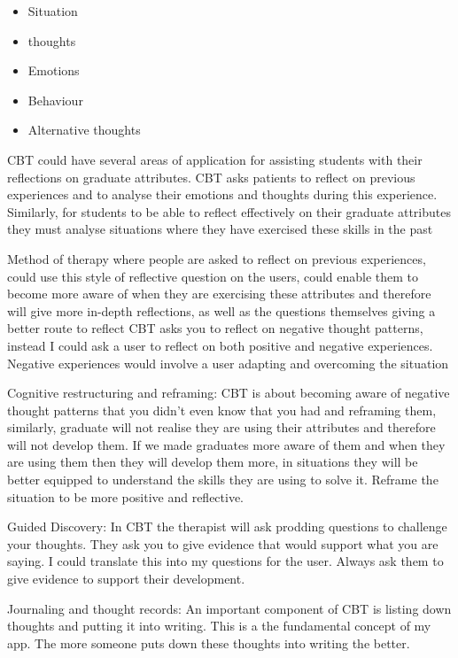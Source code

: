 \documentclass{l4proj}
\begin{document}
\begin{itemize}
    \item Situation
    \item thoughts
    \item Emotions 
    \item Behaviour
    \item Alternative thoughts 
\end{itemize}

CBT could have several areas of application for assisting students with their reflections on graduate attributes. CBT asks patients to reflect on previous
experiences and to analyse their emotions and thoughts during this experience. Similarly, for students to be able to reflect effectively on their graduate 
attributes they must analyse situations where they have exercised these skills in the past 

Method of therapy where people are asked to reflect on previous experiences, could use this style of reflective question on the users, could enable them to 
become more aware of when they are exercising these attributes and therefore will give more in-depth reflections, as well as the questions themselves giving 
a better route to reflect
CBT asks you to reflect on negative thought patterns, instead I could ask a user to reflect on both positive and negative experiences. Negative experiences 
would involve a user adapting and overcoming the situation

Cognitive restructuring and reframing: CBT is about becoming aware of negative thought patterns that you didn't even know that you had and reframing them, 
similarly, graduate will not realise they are using their attributes and therefore will not develop them. If we made graduates more aware of them and when 
they are using them then they will develop them more, in situations they will be better equipped to understand the skills they are using to solve it. Reframe 
the situation to be more positive and reflective.

Guided Discovery: In CBT the therapist will ask prodding questions to challenge your thoughts. They ask you to give evidence that would support what you are 
saying. I could translate this into my questions for the user. Always ask them to give evidence to support their development.

Journaling and thought records: An important component of CBT is listing down thoughts and putting it into writing. This is a the fundamental concept of my app. 
The more someone puts down these thoughts into writing the better.
\end{document}
